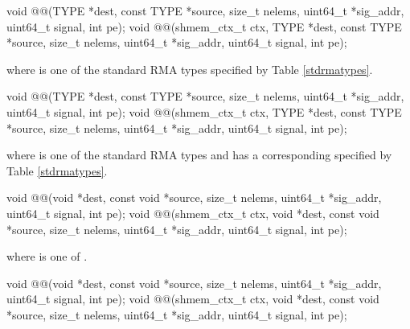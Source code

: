 \color{Green}

\begin{apidefinition}

\begin{C11synopsis}
void @@(TYPE *dest, const TYPE *source, size_t nelems, uint64_t *sig_addr, uint64_t signal, int pe);
void @@(shmem_ctx_t ctx, TYPE *dest, const TYPE *source, size_t nelems, uint64_t *sig_addr, uint64_t signal, int pe);
\end{C11synopsis}
where \TYPE{} is one of the standard \ac{RMA} types specified by Table \ref{stdrmatypes}.

\begin{Csynopsis}
void @@(TYPE *dest, const TYPE *source, size_t nelems, uint64_t *sig_addr, uint64_t signal, int pe);
void @@(shmem_ctx_t ctx, TYPE *dest, const TYPE *source, size_t nelems, uint64_t *sig_addr, uint64_t signal, int pe);
\end{Csynopsis}
where \TYPE{} is one of the standard \ac{RMA} types and has a corresponding \TYPENAME{} specified by Table \ref{stdrmatypes}.

\begin{CsynopsisCol}
void @@(void *dest, const void *source, size_t nelems, uint64_t *sig_addr, uint64_t signal, int pe);
void @@(shmem_ctx_t ctx, void *dest, const void *source, size_t nelems, uint64_t *sig_addr, uint64_t signal, int pe);
\end{CsynopsisCol}
where \SIZE{} is one of .

\begin{CsynopsisCol}
void @@(void *dest, const void *source, size_t nelems, uint64_t *sig_addr, uint64_t signal, int pe);
void @@(shmem_ctx_t ctx, void *dest, const void *source, size_t nelems, uint64_t *sig_addr, uint64_t signal, int pe);
\end{CsynopsisCol}


\end{apidefinition}
